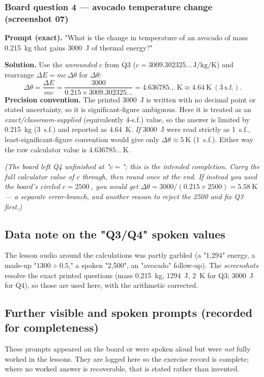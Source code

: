 \documentclass[11pt,a4paper]{article}
\newcommand{\dtheta}{\Delta\theta}
\newcommand{\dE}{\Delta E}
\begin{document}
\subsubsection*{Board question 4 --- avocado temperature change (screenshot 07)}
\begin{plainbox}
\textbf{Prompt (exact).} "What is the change in temperature of an avocado of mass
\SI{0.215}{\kilogram} that gains \SI{3000}{\joule} of thermal energy?"

\smallskip
\textbf{Solution.} Use the \emph{unrounded} $c$ from Q3 ($c = 3009.302325\ldots\,\si{\joule\per\kilogram\per\kelvin}$)
and rearrange $\dE = mc\,\dtheta$ for $\dtheta$:
\[
\dtheta = \frac{\dE}{mc} = \frac{3000}{0.215 \times 3009.302325\ldots}
  = 4.636785\ldots\ \si{\kelvin} \approx \boxed{\SI{4.64}{\kelvin}}\ (3~\text{s.f.}).
\]
\textbf{Precision convention.} The printed \SI{3000}{\joule} is written with no decimal point
or stated uncertainty, so it is significant-figure ambiguous. Here it is treated as an
\emph{exact/classroom-supplied} (equivalently 4-s.f.) value, so the answer is limited by
\SI{0.215}{\kilogram} (3~s.f.) and reported as \SI{4.64}{\kelvin}. \emph{If} \SI{3000}{\joule}
were read strictly as 1~s.f., least-significant-figure convention would give only
$\dtheta \approx \SI{5}{\kelvin}$ (1~s.f.). Either way the raw calculator value is
$4.636785\ldots\,\si{\kelvin}$.

\smallskip
\emph{(The board left Q4 unfinished at "$c=$"; this is the intended completion. Carry the
full calculator value of $c$ through, then round \emph{once} at the end. If instead you used
the board's circled $c=\SI{2500}{}$, you would get
$\dtheta = 3000/(0.215\times2500) = \SI{5.58}{\kelvin}$ --- a separate error-branch, and
another reason to reject the 2500 and fix Q3 first.)}
\end{plainbox}

\subsection{Data note on the "Q3/Q4" spoken values}
The lesson audio around the calculations was partly garbled (a "1,294" energy, a made-up
"$1300 \div 0.5$," a spoken "2,500", an "avocado" follow-up). The \emph{screenshots}
resolve the exact printed questions (mass \SI{0.215}{\kilogram}, \SI{1294}{\joule},
\SI{2}{\kelvin} for Q3; \SI{3000}{\joule} for Q4), so those are used here, with the
arithmetic corrected.

\subsection{Further visible and spoken prompts (recorded for completeness)}
\label{sec:visible-prompts}
These prompts appeared on the board or were spoken aloud but were \emph{not} fully worked in
the lessons. They are logged here so the exercise record is complete; where no worked answer
is recoverable, that is stated rather than invented.
\end{document}
